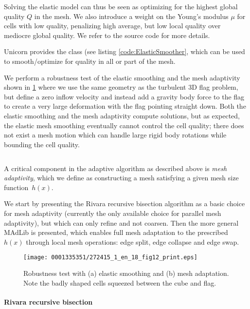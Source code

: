 Solving the elastic model can thus be seen as optimizing for the
highest global quality $Q$ in the mesh. We also introduce a weight on
the Young's modulus $\mu$ for cells with low quality, penalizing high
average, but low local quality over mediocre global quality. We refer
to the source code for more details.

Unicorn provides the  class (see listing
\ref{code:ElasticSmoother}, which can be used to smooth/optimize for
quality in all or part of the mesh.

We perform a robustness test of the elastic smoothing and the mesh
adaptivity shown in \ref{fig:flag_robustness} where we use the same
geometry as the turbulent 3D flag problem, but define a zero inflow
velocity and instead add a gravity body force to the flag to create a
very large deformation with the flag pointing straight down. Both the
elastic smoothing and the mesh adaptivity compute solutions, but as
expected, the elastic mesh smoothing eventually cannot control the
cell quality; there does not exist a mesh motion which can handle
large rigid body rotations while bounding the cell quality.

\subsection{}

A critical component in the adaptive algorithm as described above is
{\em mesh adaptivity}, which we define as constructing a mesh
satisfying a given mesh size function~$h(x)$.

We start by presenting the Rivara recursive bisection algorithm
\citep{Rivara1992} as a basic choice for mesh adaptivity (currently
the only available choice for parallel mesh adaptivity), but which can
only refine and not coarsen. Then the more general MAdLib is
presented, which enables full mesh adaptation to the prescribed
$h(x)$ through local mesh operations: edge split, edge collapse and
edge swap.

\begin{figure}[!t]
\bwfig
\centering
\texttt{[image: 0001335351/272415\_1\_en\_18\_fig12\_print.eps]}
\caption{Robustness test with (a) elastic smoothing and (b) mesh
adaptation. Note the badly shaped cells squeezed between the cube
and flag.}\label{fig:flag_robustness}\vspace*{10pt}
\end{figure}


\paragraph{Rivara recursive bisection}

